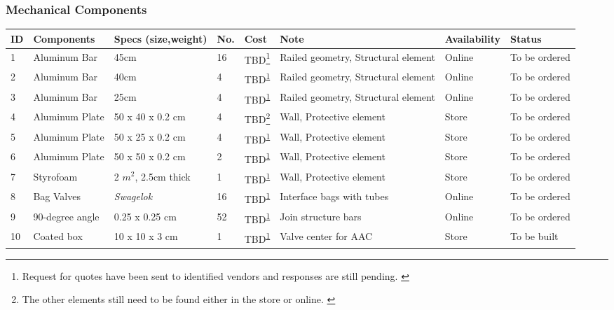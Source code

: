 \documentclass[a4paper,12pt,twoside]{article}
\begin{document}
\begin{landscape}
\subsubsection{Mechanical Components}


\begin{longtable}{|m{}|m{}|m{}|m{}|m{}|m{}|m{}|m{}|}

   
\hline
\textbf{ID} & \textbf{Components} & \textbf{Specs (size,weight)} & \textbf{No.} & \textbf{Cost} & \textbf{Note} & \textbf{Availability} & \textbf{Status} \\ \hline
1 & Aluminum Bar & 45cm & 16 & TBD\footnote{Request for quotes have been sent to identified vendors and responses are still pending. \label{fn:mechcomp1}} & Railed geometry, Structural element & Online & To be ordered \\ \hline
2 & Aluminum Bar & 40cm & 4 & TBD\textsuperscript{\ref{fn:mechcomp1}} & Railed geometry, Structural element & Online & To be ordered \\ \hline
3 & Aluminum Bar & 25cm & 4 & TBD\textsuperscript{\ref{fn:mechcomp1}} & Railed geometry, Structural element & Online & To be ordered \\ \hline
4 & Aluminum Plate & 50 x 40 x 0.2 cm & 4 & TBD\footnote{The other elements still need to be found either in the store or online. \label{fn:mechcomp2}} & Wall, Protective element & Store & To be ordered \\ \hline
5 & Aluminum Plate & 50 x 25 x 0.2 cm & 4 & TBD\textsuperscript{\ref{fn:mechcomp2}} & Wall, Protective element & Store & To be ordered \\ \hline
6 & Aluminum Plate & 50 x 50 x 0.2 cm & 2 & TBD\textsuperscript{\ref{fn:mechcomp2}} & Wall, Protective element & Store & To be ordered \\ \hline
7 & Styrofoam & 2 $m^2$, 2.5cm thick & 1 & TBD\textsuperscript{\ref{fn:mechcomp2}} & Wall, Protective element & Store & To be ordered \\ \hline
8 & Bag Valves & \textit{Swagelok} & 16 & TBD\textsuperscript{\ref{fn:mechcomp1}} & Interface bags with tubes & Online & To be ordered \\ \hline
9 & 90-degree angle & 0.25 x 0.25 cm & 52 & TBD\textsuperscript{\ref{fn:mechcomp2}} & Join structure bars & Online & To be ordered \\ \hline
10 & Coated box & 10 x 10 x 3 cm & 1 & TBD\textsuperscript{\ref{fn:mechcomp2}} & Valve center for AAC & Store & To be built \\ \hline

\end{longtable}
\end{landscape}
\end{document}
